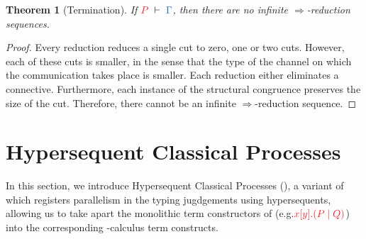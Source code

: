 \documentclass[draft,submission,copyright,creativecommons]{eptcs}
\makeatletter
\newtheorem{theorem}{Theorem}
\renewcommand*{\eg}{e.g.\@\xspace}
\makeatother
\begin{document}
\begin{theorem}[Termination]\label{thm:cp-termination}
  If $\seq[P]{\Gamma}$, then there are no infinite $\Longrightarrow$-reduction
  sequences.
\end{theorem}\vspace*{-0.75\baselineskip}%
\begin{proof}
  Every reduction reduces a single cut to zero, one or two cuts.
  However, each of these cuts is smaller, in the sense that the type of the
  channel on which the communication takes place is smaller.
  Each reduction either eliminates a connective.
  Furthermore, each instance of the structural congruence preserves the size of
  the cut.
  Therefore, there cannot be an infinite $\Longrightarrow$-reduction sequence.
\end{proof}


\section{Hypersequent Classical Processes}
\label{sec:hcp}

In this section, we introduce Hypersequent Classical Processes (\hcp), a variant
of \cp which registers parallelism in the typing jugdgements using
hypersequents, allowing us to take apart the monolithic term constructors of \cp
(\eg $\tm{\cpSend{x}{y}{P}{Q}}$) into the corresponding \textpi-calculus term
constructs.
\end{document}
